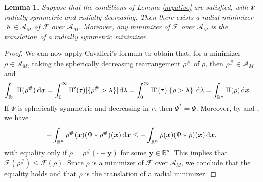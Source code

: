\documentclass[reqno,11pt]{amsart}
\numberwithin{equation}{section}
\newtheorem{lemma}[theorem]{Lemma}
\theoremstyle{definition}
\def\dd{{\, \rm d}}
\begin{document}
\begin{lemma}\label{symm}
Suppose that the conditions of {\rm Lemma \ref{negative}} are satisfied, with $\Psi$ radially symmetric and radially decreasing. Then there exists a radial minimizer $\bar{\varrho} \in \mathcal{A}_M$ of $\mathcal{F}$ over $\mathcal{A}_M$. Moreover, any minimizer of $\mathcal{F}$ over $\mathcal{A}_M$ is the translation of a radially symmetric minimizer.
\end{lemma}

\begin{proof}
We can now apply Cavalieri's formula to obtain that, 
for a minimizer $\bar{\rho} \in \mathcal{A}_M$, 
taking the spherically decreasing rearrangement $\rho^\#$ of $\bar{\rho}$, then
$\rho^\# \in \mathcal{A}_M$ and
\begin{align*}
 \int_{\mathbb{R}^n} \Pi (\rho^\#) \dd \boldsymbol{x} & =  \int^\infty_0 \Pi'(\tau) |\{ \rho^\# > \lambda \}| \dd \lambda  = \int^\infty_0 \Pi'(\tau) |\{ \bar{\rho} > \lambda \}| \dd \lambda= \int_{\mathbb{R}^n} \Pi (\bar{\rho}) \dd \boldsymbol{x}.
\end{align*}
If $\Psi$ is spherically symmetric and decreasing in $r$, 
then $\Psi^* = \Psi$. 
Moreover, by \cite{sobolev1938theorem} and \cite[Theorem 3.9]{Lieb_2001}, we have
\begin{equation*}
- \int_{\mathbb{R}^n} \rho^\#(\boldsymbol{x}) (\Psi * \rho^\#)(\boldsymbol{x}) \dd \boldsymbol{x} \leq - \int_{\mathbb{R}^n} \bar{\rho}(\boldsymbol{x}) (\Psi * \bar{\rho})(\boldsymbol{x}) \dd \boldsymbol{x},
\end{equation*}
with equality only if $\bar{\rho} = \rho^\#(\cdot -\boldsymbol{y})$ 
for some $\boldsymbol{y} \in \mathbb{R}^n$. 
This implies that $\mathcal{F}(\rho^\#) \leq \mathcal{F}(\bar{\rho})$. 
Since $\bar{\rho}$ is a minimizer of $\mathcal{F}$ over $\mathcal{A}_M$, 
we conclude that the equality holds and that $\bar{\rho}$ is the translation of a radial minimizer.
\end{proof}
\end{document}
